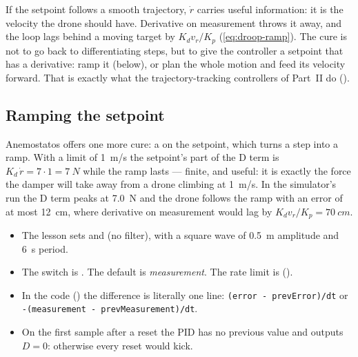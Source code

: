 \begin{watchout}
If the setpoint follows a smooth trajectory, $\dot r$ carries useful information: it is the velocity the drone should have. Derivative on measurement throws it away, and the loop lags behind a moving target by $K_d v_r/K_p$ (\cref{eq:droop-ramp}). The cure is not to go back to differentiating steps, but to give the controller a setpoint that has a derivative: ramp it (below), or plan the whole motion and feed its velocity forward. That is exactly what the trajectory-tracking controllers of Part~II do ().
\end{watchout}

\subsection{Ramping the setpoint}
Anemostatos offers one more cure: a  on the setpoint, which turns a step into a ramp. With a limit of \SI{1}{m/s} the setpoint's part of the D term is $K_d\,\dot r = 7 \cdot 1 = \SI{7}{N}$ while the ramp lasts — finite, and useful: it is exactly the force the damper will take away from a drone climbing at \SI{1}{m/s}. In the simulator's run the D term peaks at \SI{7.0}{N} and the drone follows the ramp with an error of at most \SI{12}{cm}, where derivative on measurement would lag by $K_dv_r/K_p = \SI{70}{cm}$.


\begin{inapp}
\begin{itemize}[leftmargin=1.2em]
  \item The lesson sets  and  (no filter), with a square wave of \SI{0.5}{m} amplitude and \SI{6}{s} period.
  \item The switch is . The default is \emph{measurement}. The rate limit is  ().
  \item In the code () the difference is literally one line: \texttt{(error - prevError)/dt} or \texttt{-(measurement - prevMeasurement)/dt}.
  \item On the first sample after a reset the PID has no previous value and outputs $D = 0$: otherwise every reset would kick.
\end{itemize}
\end{inapp}


